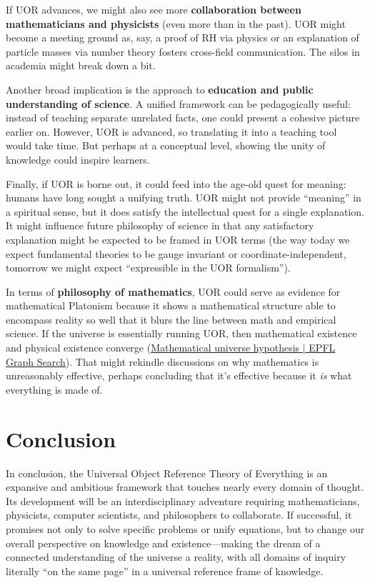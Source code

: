 \documentclass[12pt]{article}
\begin{document}
\medskip

If UOR advances, we might also see more \textbf{collaboration between mathematicians and physicists} (even more than in the past). UOR might become a meeting ground as, say, a proof of RH via physics or an explanation of particle masses via number theory fosters cross-field communication. The silos in academia might break down a bit.

\medskip

Another broad implication is the approach to \textbf{education and public understanding of science}. A unified framework can be pedagogically useful: instead of teaching separate unrelated facts, one could present a cohesive picture earlier on. However, UOR is advanced, so translating it into a teaching tool would take time. But perhaps at a conceptual level, showing the unity of knowledge could inspire learners.

\medskip

Finally, if UOR is borne out, it could feed into the age-old quest for meaning: humans have long sought a unifying truth. UOR might not provide ``meaning'' in a spiritual sense, but it does satisfy the intellectual quest for a single explanation. It might influence future philosophy of science in that any satisfactory explanation might be expected to be framed in UOR terms (the way today we expect fundamental theories to be gauge invariant or coordinate-independent, tomorrow we might expect ``expressible in the UOR formalism'').

\medskip

In terms of \textbf{philosophy of mathematics}, UOR could serve as evidence for mathematical Platonism because it shows a mathematical structure able to encompass reality so well that it blurs the line between math and empirical science. If the universe is essentially running UOR, then mathematical existence and physical existence converge (\href{https://graphsearch.epfl.ch/concept/2148329#:~:text=proposed%20by%20cosmologist%20Max%20Tegmark,The}{Mathematical universe hypothesis | EPFL Graph Search}). That might rekindle discussions on why mathematics is unreasonably effective, perhaps concluding that it's effective because it \emph{is} what everything is made of.

\bigskip

\section*{Conclusion}

In conclusion, the Universal Object Reference Theory of Everything is an expansive and ambitious framework that touches nearly every domain of thought. Its development will be an interdisciplinary adventure requiring mathematicians, physicists, computer scientists, and philosophers to collaborate. If successful, it promises not only to solve specific problems or unify equations, but to change our overall perspective on knowledge and existence---making the dream of a connected understanding of the universe a reality, with all domains of inquiry literally ``on the same page'' in a universal reference frame of knowledge.

\bigskip

\end{document}
